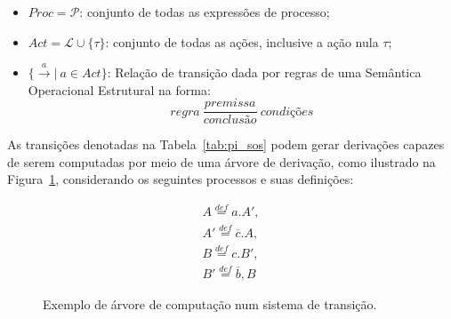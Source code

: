 \begin{itemize}
	\item $Proc = \mathcal{P}$: conjunto de todas as expressões de processo;
	\item $Act = \mathcal{L}\cup\{\tau\}$: conjunto de todas as ações, inclusive a ação nula $\tau$;
	\item $\{\stackrel{a}{\longrightarrow}|~a \in Act\}$: Relação de transição dada por regras de uma Semântica Operacional Estrutural na forma:
\begin{equation}
regra~\dfrac{premissa}{conclusão}~condições 
\end{equation}	
\end{itemize}

As transições denotadas na Tabela~\ref{tab:pi_sos} podem gerar derivações capazes de serem computadas por meio de uma árvore de derivação, como ilustrado na Figura~\ref{fig:ccs_tree}, considerando os seguintes processos e suas definições:

\begin{equation}
\begin{align*}
A \stackrel{def}{=} a.A',\\
A' \stackrel{def}{=} \overline{c}.A,\\
B \stackrel{def}{=} c.B',\\
B' \stackrel{def}{=} \overline{b},B
\end{align*}
\end{equation} 

\begin{figure}[ht]
	\centering
{}	
	\caption{Exemplo de árvore de computação num sistema de transição.
		\label{fig:ccs_tree}}
\end{figure}
\FloatBarrier

